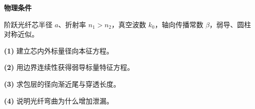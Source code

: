 \textbf{物理条件}\par 阶跃光纤芯半径 \(a\)、折射率 \(n_1>n_2\)，真空波数 \(k_0\)，轴向传播常数 \(\beta\)，弱导、圆柱对称近似。
\par\noindent\textbf{(1)} 建立芯内外标量径向本征方程。
\par\noindent\textbf{(2)} 用边界连续性获得弱导标量特征方程。
\par\noindent\textbf{(3)} 求包层的径向渐近尾与穿透长度。
\par\noindent\textbf{(4)} 说明光纤弯曲为什么增加泄漏。
